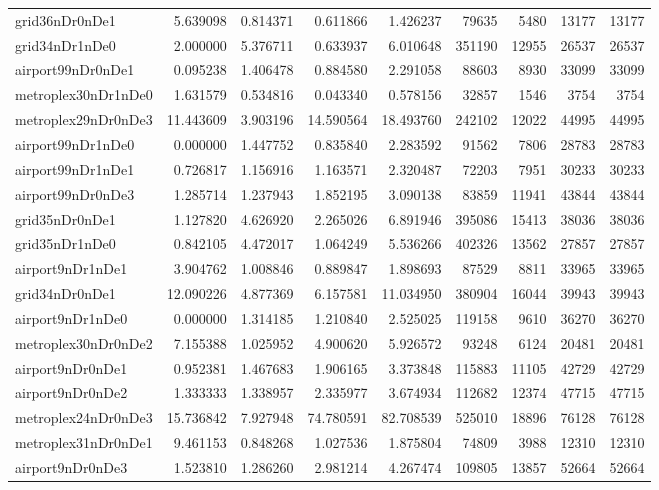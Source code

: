 \begin{longtable}{|l|r|r|r|r|r|r|r|r|}
grid36nDr0nDe1 & 5.639098 & 0.814371 & 0.611866 & 1.426237 & 79635 & 5480 & 13177 & 13177 \\
grid34nDr1nDe0 & 2.000000 & 5.376711 & 0.633937 & 6.010648 & 351190 & 12955 & 26537 & 26537 \\
airport99nDr0nDe1 & 0.095238 & 1.406478 & 0.884580 & 2.291058 & 88603 & 8930 & 33099 & 33099 \\
metroplex30nDr1nDe0 & 1.631579 & 0.534816 & 0.043340 & 0.578156 & 32857 & 1546 & 3754 & 3754 \\
metroplex29nDr0nDe3 & 11.443609 & 3.903196 & 14.590564 & 18.493760 & 242102 & 12022 & 44995 & 44995 \\
airport99nDr1nDe0 & 0.000000 & 1.447752 & 0.835840 & 2.283592 & 91562 & 7806 & 28783 & 28783 \\
airport99nDr1nDe1 & 0.726817 & 1.156916 & 1.163571 & 2.320487 & 72203 & 7951 & 30233 & 30233 \\
airport99nDr0nDe3 & 1.285714 & 1.237943 & 1.852195 & 3.090138 & 83859 & 11941 & 43844 & 43844 \\
grid35nDr0nDe1 & 1.127820 & 4.626920 & 2.265026 & 6.891946 & 395086 & 15413 & 38036 & 38036 \\
grid35nDr1nDe0 & 0.842105 & 4.472017 & 1.064249 & 5.536266 & 402326 & 13562 & 27857 & 27857 \\
airport9nDr1nDe1 & 3.904762 & 1.008846 & 0.889847 & 1.898693 & 87529 & 8811 & 33965 & 33965 \\
grid34nDr0nDe1 & 12.090226 & 4.877369 & 6.157581 & 11.034950 & 380904 & 16044 & 39943 & 39943 \\
airport9nDr1nDe0 & 0.000000 & 1.314185 & 1.210840 & 2.525025 & 119158 & 9610 & 36270 & 36270 \\
metroplex30nDr0nDe2 & 7.155388 & 1.025952 & 4.900620 & 5.926572 & 93248 & 6124 & 20481 & 20481 \\
airport9nDr0nDe1 & 0.952381 & 1.467683 & 1.906165 & 3.373848 & 115883 & 11105 & 42729 & 42729 \\
airport9nDr0nDe2 & 1.333333 & 1.338957 & 2.335977 & 3.674934 & 112682 & 12374 & 47715 & 47715 \\
metroplex24nDr0nDe3 & 15.736842 & 7.927948 & 74.780591 & 82.708539 & 525010 & 18896 & 76128 & 76128 \\
metroplex31nDr0nDe1 & 9.461153 & 0.848268 & 1.027536 & 1.875804 & 74809 & 3988 & 12310 & 12310 \\
airport9nDr0nDe3 & 1.523810 & 1.286260 & 2.981214 & 4.267474 & 109805 & 13857 & 52664 & 52664 \\

\end{longtable}
